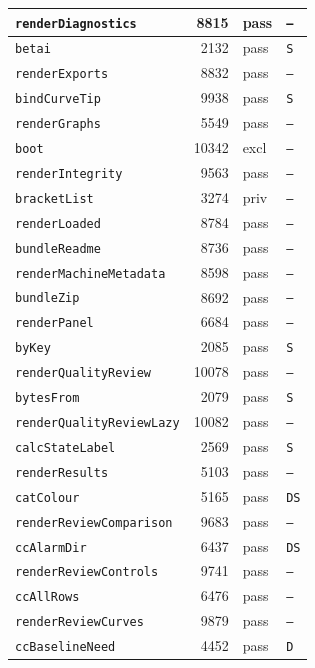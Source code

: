 {\begin{xltabular}{\linewidth}{|l|r|X|X|}
\texttt{renderDiagnostics} & 8815 & pass & \texttt{--} \\ \hline
\texttt{betai} & 2132 & pass & \texttt{S} \\ \hline
\texttt{renderExports} & 8832 & pass & \texttt{--} \\ \hline
\texttt{bindCurveTip} & 9938 & pass & \texttt{S} \\ \hline
\texttt{renderGraphs} & 5549 & pass & \texttt{--} \\ \hline
\texttt{boot} & 10342 & excl & \texttt{--} \\ \hline
\texttt{renderIntegrity} & 9563 & pass & \texttt{--} \\ \hline
\texttt{bracketList} & 3274 & priv & \texttt{--} \\ \hline
\texttt{renderLoaded} & 8784 & pass & \texttt{--} \\ \hline
\texttt{bundleReadme} & 8736 & pass & \texttt{--} \\ \hline
\texttt{renderMachineMetadata} & 8598 & pass & \texttt{--} \\ \hline
\texttt{bundleZip} & 8692 & pass & \texttt{--} \\ \hline
\texttt{renderPanel} & 6684 & pass & \texttt{--} \\ \hline
\texttt{byKey} & 2085 & pass & \texttt{S} \\ \hline
\texttt{renderQualityReview} & 10078 & pass & \texttt{--} \\ \hline
\texttt{bytesFrom} & 2079 & pass & \texttt{S} \\ \hline
\texttt{renderQualityReviewLazy} & 10082 & pass & \texttt{--} \\ \hline
\texttt{calcStateLabel} & 2569 & pass & \texttt{S} \\ \hline
\texttt{renderResults} & 5103 & pass & \texttt{--} \\ \hline
\texttt{catColour} & 5165 & pass & \texttt{DS} \\ \hline
\texttt{renderReviewComparison} & 9683 & pass & \texttt{--} \\ \hline
\texttt{ccAlarmDir} & 6437 & pass & \texttt{DS} \\ \hline
\texttt{renderReviewControls} & 9741 & pass & \texttt{--} \\ \hline
\texttt{ccAllRows} & 6476 & pass & \texttt{--} \\ \hline
\texttt{renderReviewCurves} & 9879 & pass & \texttt{--} \\ \hline
\texttt{ccBaselineNeed} & 4452 & pass & \texttt{D} \\ \hline

\end{xltabular}}
